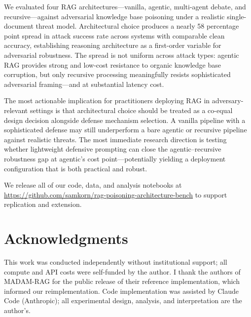 \documentclass[11pt]{article}
\begin{document}
We evaluated four RAG architectures---vanilla, agentic, multi-agent debate, and recursive---against adversarial knowledge base poisoning under a realistic single-document threat model. Architectural choice produces a nearly 58 percentage point spread in attack success rate across systems with comparable clean accuracy, establishing reasoning architecture as a first-order variable for adversarial robustness. The spread is not uniform across attack types: agentic RAG provides strong and low-cost resistance to organic knowledge base corruption, but only recursive processing meaningfully resists sophisticated adversarial framing---and at substantial latency cost.

The most actionable implication for practitioners deploying RAG in adversary-relevant settings is that architectural choice should be treated as a co-equal design decision alongside defense mechanism selection. A vanilla pipeline with a sophisticated defense may still underperform a bare agentic or recursive pipeline against realistic threats. The most immediate research direction is testing whether lightweight defensive prompting can close the agentic--recursive robustness gap at agentic's cost point---potentially yielding a deployment configuration that is both practical and robust.

We release all of our code, data, and analysis notebooks at \url{https://github.com/samkorn/rag-poisoning-architecture-bench} to support replication and extension.


\section*{Acknowledgments}

This work was conducted independently without institutional support; all compute and API costs were self-funded by the author. I thank the authors of MADAM-RAG \citep{wang2025madamrag} for the public release of their reference implementation, which informed our reimplementation. Code implementation was assisted by Claude Code (Anthropic); all experimental design, analysis, and interpretation are the author's.






\appendix
\makeatletter
\renewcommand{\@seccntformat}[1]{%
  \expandafter\ifx\csname #1\endcsname\section
    Appendix~\csname the#1\endcsname\quad
  \else
    \csname the#1\endcsname\quad
  \fi
}
\makeatother
\end{document}
